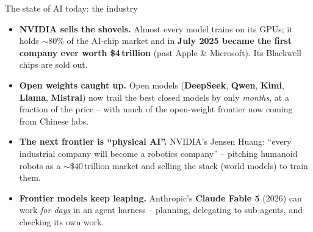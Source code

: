 \documentclass[aspectratio=43]{beamer}
\begin{document}
\begin{frame}{The state of AI today: the industry}
  \begin{itemize}\small
    \item \textbf{NVIDIA sells the shovels.} Almost every model trains on its GPUs; it holds
      $\sim$80\% of the AI-chip market and in \textbf{July 2025 became the first company ever
      worth \$4\,trillion} (past Apple \& Microsoft). Its Blackwell chips are sold out.
    \item \textbf{Open weights caught up.} Open models (\textbf{DeepSeek}, \textbf{Qwen},
      \textbf{Kimi}, \textbf{Llama}, \textbf{Mistral}) now trail the best closed models by only
      \emph{months}, at a fraction of the price -- with much of the open-weight frontier now
      coming from Chinese labs.
    \item \textbf{The next frontier is ``physical AI''.} NVIDIA's Jensen Huang: ``every
      industrial company will become a robotics company'' -- pitching humanoid robots as a
      $\sim$\$40\,trillion market and selling the stack (world models) to train them.
    \item \textbf{Frontier models keep leaping.} Anthropic's \textbf{Claude Fable 5} (2026) can
      work \emph{for days} in an agent harness -- planning, delegating to sub-agents, and
      checking its own work.
  \end{itemize}
  \vfill
\end{frame}
\end{document}
